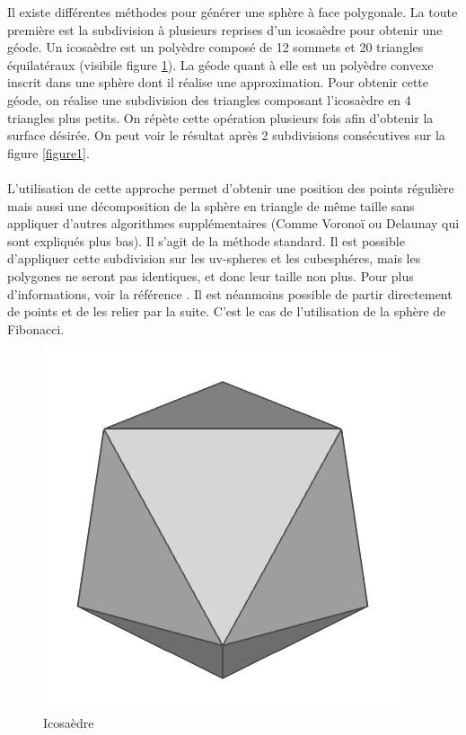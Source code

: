 \documentclass[a4paper]{article}
\begin{document}
Il existe différentes méthodes pour générer une sphère à face polygonale. La toute première est la subdivision à plusieurs reprises d'un  icosaèdre pour obtenir une géode. Un icosaèdre est un polyèdre composé de  12 sommets et 20 triangles équilatéraux (visibile figure  \ref{figure0}). La géode quant à elle est un polyèdre convexe inscrit dans une sphère dont il réalise une approximation. Pour obtenir cette géode, on réalise une subdivision des triangles composant l'icosaèdre en  4 triangles plus petits. On répète cette opération plusieurs fois afin d'obtenir la surface désirée. On peut voir le résultat après 2 subdivisions consécutives sur la figure \ref{figure1}.\\
\\
L'utilisation de cette approche permet d'obtenir une position des points régulière mais aussi une décomposition de la sphère en triangle de même taille sans appliquer d'autres algorithmes supplémentaires (Comme Voronoï ou Delaunay qui sont expliqués plus bas). Il s'agit de la méthode standard. Il est possible d'appliquer cette subdivision sur les uv-spheres et les cubesphéres, mais les polygones ne seront pas identiques, et donc leur taille non plus. Pour plus d'informations, voir la référence \cite{SongHoAhn}. Il est néanmoins possible de partir directement de points et de les relier par la suite. C'est le cas de l'utilisation de la sphère de Fibonacci.\\

\begin{figure}[!h]
    \begin{center}
        \includegraphics[width=0.2\linewidth]{img/sphere/gl_sphere05.png}
        \caption{Icosaèdre\protect\footnotemark}
        \label{figure0}
    \end{center}
\end{figure}

\end{document}
